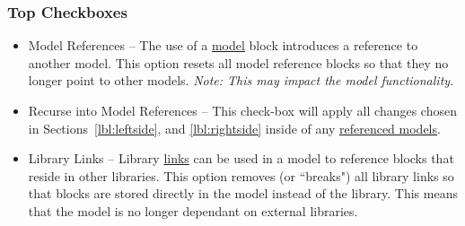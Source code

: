 \documentclass{article}
\begin{document}
\subsubsection{Top Checkboxes}
\begin{itemize}
	\item Model References -- The use of a \href{https://www.mathworks.com/help/simulink/slref/model.html}{model} block introduces a reference to another model. This option resets all model reference blocks so that they no longer point to other models. \emph{Note: This may impact the model functionality.}
	\item Recurse into Model References -- This check-box will apply all changes chosen in Sections~\ref{lbl:leftside}, and \ref{lbl:rightside} inside of any \href{https://de.mathworks.com/help/simulink/model-reference.html}{referenced models}.
	\item Library Links -- Library \href{https://www.mathworks.com/help/simulink/ug/creating-and-working-with-linked-blocks.html}{links} can be used in a model to reference blocks that reside in other libraries. This option removes (or ``breaks") all library links so that blocks are stored directly in the model instead of the library. This means that the model is no longer dependant on external libraries.
\end{itemize}
\end{document}

